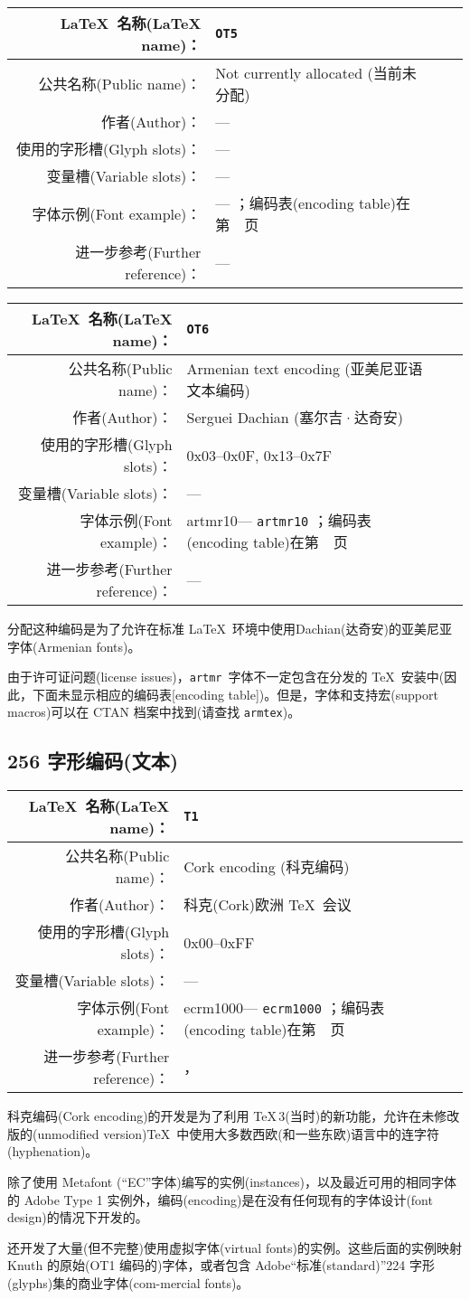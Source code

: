 \documentclass{ltxguide}[1994/11/20]
\makeatletter
\newenvironment{encodinginfo}[7]%
  {\noindent
   \begin{tabularx}{1.11\textwidth}{|rX|lX|}%
     \hline
     \LaTeX{}\ 名称(\LaTeX{} name)：          & \texttt{#1}\\\hline%
     公共名称(Public name)：          & #2\\\hline%
     作者(Author)：                   & #3\\\hline%
     使用的字形槽(Glyph slots)：& #4\\\hline%
     变量槽(Variable slots)：& #5\\\hline%
     字体示例(Font example)：& \def\@tempa{#6}\ifx\@tempa\@empty---%
                            \else\texttt{#6}\referenceftable{#6}\fi\\\hline%
     进一步参考(Further reference)： & #7\\\hline%
   \end{tabularx}%
   \par\nobreak
   \vspace*{3pt}%
   \quote
  }%
  {\endquote
   \vspace{6pt}}
\def\referenceftable#1{
  \@ifundefined{r@fonttable:#1}%
  \relax
  {；\space 编码表(encoding table)在第~\pageref{fonttable:#1}~页}%
}
\makeatother
\begin{document}
\begin{encodinginfo}{OT5}
        {Not currently allocated (当前未分配)}
        {---}
        {---}
        {---}
        {}
        {---}

\end{encodinginfo}



\begin{encodinginfo}{OT6}
        {Armenian text encoding (亚美尼亚语文本编码)}
        {Serguei Dachian (塞尔吉·达奇安)}
        {0x03--0x0F, 0x13--0x7F}
        {---}
        {artmr10}
        {---}

  分配这种编码是为了允许在标准 \LaTeX{}\ 环境中使用Dachian(达奇安)的亚美尼亚字体(Armenian fonts)。

  由于许可证问题(license issues)，\texttt{artmr}\ 字体不一定包含在分发的 \TeX{}\ 安装中(因此，下面未显示相应的编码表[encoding table])。但是，字体和支持宏(support macros)可以在 CTAN 档案中找到(请查找 \texttt{armtex})。

\end{encodinginfo}



\subsection{256 字形编码(文本)}

\begin{encodinginfo}{T1}
        {Cork encoding (科克编码)}
        {科克(Cork)欧洲 \TeX{}\ 会议}
        {0x00--0xFF}
        {---}
        {ecrm1000}
        {\cite[第 514 页]{tub:MFe90}，\cite[第 99 页]{Knappen:TB17-2-96}}

  科克编码(Cork encoding)的开发是为了利用 \TeX{}\,3(当时)的新功能，允许在未修改版的(unmodified version)\TeX{}\ 中使用大多数西欧(和一些东欧)语言中的连字符(hyphenation)。

  除了使用 Metafont (“EC”字体)编写的实例(instances)，以及最近可用的相同字体的 Adobe Type 1 实例外，编码(encoding)是在没有任何现有的字体设计(font design)的情况下开发的。

  还开发了大量(但不完整)使用虚拟字体(virtual fonts)的实例。这些后面的实例映射 Knuth 的原始(OT1 编码的)字体，或者包含 Adobe“标准(standard)”224 字形(glyphs)集的商业字体(com-mercial fonts)。
\end{encodinginfo}
\end{document}

